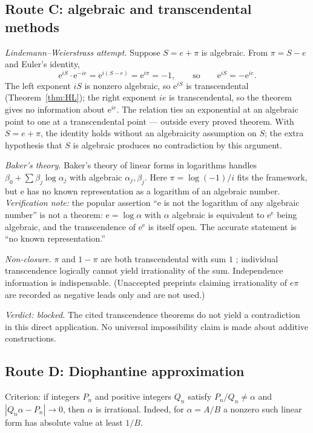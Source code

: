 \documentclass[11pt]{amsart}
\theoremstyle{definition}
\theoremstyle{remark}
\numberwithin{equation}{section}
\newcommand{\ee}{\mathrm{e}}
\begin{document}
\subsection{Route C: algebraic and transcendental methods}

\emph{Lindemann--Weierstrass attempt.} Suppose $S=e+\pi$ is algebraic. From $\pi=S-e$ and Euler's identity,
\[
\ee^{iS}\cdot\ee^{-ie}=\ee^{i(S-e)}=\ee^{i\pi}=-1,\qquad\text{so}\qquad \ee^{iS}=-\ee^{ie}.
\]
The left exponent $iS$ is nonzero algebraic, so $\ee^{iS}$ is transcendental (Theorem~\ref{thm:HL}); the right exponent $ie$ is transcendental, so the theorem gives no information about $\ee^{ie}$. The relation ties an exponential at an algebraic point to one at a transcendental point --- outside every proved theorem. With $S=e+\pi$, the identity holds without an algebraicity assumption on $S$; the extra hypothesis that $S$ is algebraic produces no contradiction by this argument.

\emph{Baker's theory.} Baker's theory of linear forms in logarithms \cite{Baker} handles $\beta_0+\sum\beta_j\log\alpha_j$ with algebraic $\alpha_j,\beta_j$. Here $\pi=\log(-1)/i$ fits the framework, but $\ee$ has no known representation as a logarithm of an algebraic number. \emph{Verification note:} the popular assertion ``$\ee$ is not the logarithm of any algebraic number'' is not a theorem: $\ee=\log\alpha$ with $\alpha$ algebraic is equivalent to $\ee^\ee$ being algebraic, and the transcendence of $\ee^\ee$ is itself open. The accurate statement is ``no known representation.''

\emph{Non-closure.} $\pi$ and $1-\pi$ are both transcendental with sum $1$ \cite{KepuAlgebraic}; individual transcendence logically cannot yield irrationality of the sum. Independence information is indispensable. (Unaccepted preprints claiming irrationality of $e\pi$ \cite{CarellaEpi} are recorded as negative leads only and are not used.)

\emph{Verdict: blocked.} The cited transcendence theorems do not yield a contradiction in this direct application. No universal impossibility claim is made about additive constructions.

\subsection{Route D: Diophantine approximation}

Criterion: if integers $P_n$ and positive integers $Q_n$ satisfy $P_n/Q_n\ne\alpha$ and $|Q_n\alpha-P_n|\to0$, then $\alpha$ is irrational. Indeed, for $\alpha=A/B$ a nonzero such linear form has absolute value at least $1/B$.
\end{document}
